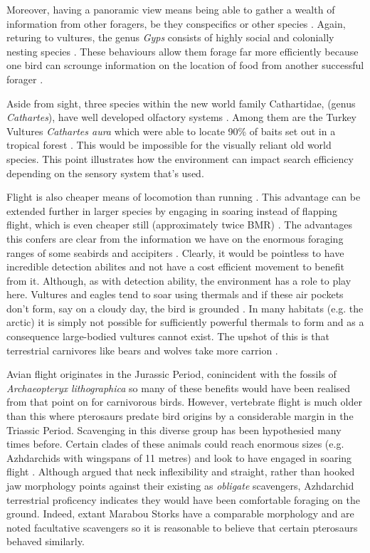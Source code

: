 \documentclass[a4paper,12pt]{article}
\begin{document}
Moreover, having a panoramic view means being able to gather a wealth of information from other foragers, be they conspecifics or other species \citep{jackson2008effect}. Again, returing to vultures, the genus \textit{Gyps} consists of highly social and colonially nesting species \citep{fernandez2015density}. These behaviours allow them forage far more efficiently because one bird can scrounge information on the location of food from another successful forager \citep{KaneVul}. 

Aside from sight, three species within the new world family Cathartidae, (genus \textit{Cathartes}), have well developed olfactory systems \citep{AR:AR22815}. Among them are the Turkey Vultures \textit{Cathartes aura} which were able to locate 90\% of baits set out in a tropical forest \citep{houston1986olfaction}. This would be impossible for the visually reliant old world species. This point illustrates how the environment can impact search efficiency depending on the sensory system that's used. 

Flight is also cheaper means of locomotion than running \citep{tucker1975energetic}. This advantage can be extended further in larger species by engaging in soaring instead of flapping flight, which is even cheaper still (approximately twice BMR) \citep{hedenstrom1993migration}. The advantages this confers are clear from the information we have on the enormous foraging ranges of some seabirds and accipiters \citep{bamford2007ranging}. Clearly, it would be pointless to have incredible detection abilites and not have a cost efficient movement to benefit from it. Although, as with detection ability, the environment has a role to play here. Vultures and eagles tend to soar using thermals and if these air pockets don't form, say on a cloudy day, the bird is grounded \citep{mundy1992vultures}. In many habitats (e.g. the arctic) it is simply not possible for sufficiently powerful thermals to form and as a consequence large-bodied vultures cannot exist. The upshot of this is that terrestrial carnivores like bears and wolves take more carrion \citep{devault2003scavenging}. 

Avian flight originates in the Jurassic Period, conincident with the fossils of \textit{Archaeopteryx lithographica} so many of these benefits would have been realised from that point on for carnivorous birds. However, vertebrate flight is much older than this where pterosaurs predate bird origins by a considerable margin in the Triassic Period. Scavenging in this diverse group has been hypothesied many times before. Certain clades of these animals could reach enormous sizes (e.g. Azhdarchids with wingspans of 11 metres) and look to have engaged in soaring flight \citep{witton2010size}.  Although \cite{witton2008reappraisal} argued that neck inflexibility and straight, rather than hooked jaw morphology points against their existing as \textit{obligate} scavengers, Azhdarchid terrestrial proficency indicates they would have been comfortable foraging on the ground. Indeed, extant Marabou Storks have a comparable morphology and are noted facultative scavengers so it is reasonable to believe that certain pterosaurs behaved similarly.   
\end{document}
